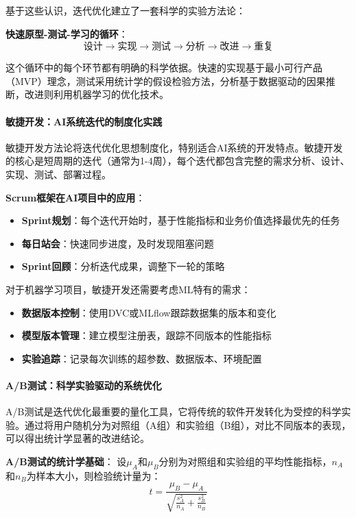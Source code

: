 基于这些认识，迭代优化建立了一套科学的实验方法论：

\textbf{快速原型-测试-学习的循环}：
$$\text{设计} \rightarrow \text{实现} \rightarrow \text{测试} \rightarrow \text{分析} \rightarrow \text{改进} \rightarrow \text{重复}$$

这个循环中的每个环节都有明确的科学依据。快速的实现基于最小可行产品（MVP）理念，测试采用统计学的假设检验方法，分析基于数据驱动的因果推断，改进则利用机器学习的优化技术。

\paragraph{敏捷开发：AI系统迭代的制度化实践}
敏捷开发方法论将迭代优化思想制度化，特别适合AI系统的开发特点。敏捷开发的核心是短周期的迭代（通常为1-4周），每个迭代都包含完整的需求分析、设计、实现、测试、部署过程。

\textbf{Scrum框架在AI项目中的应用}：
\begin{itemize}
\item \textbf{Sprint规划}：每个迭代开始时，基于性能指标和业务价值选择最优先的任务
\item \textbf{每日站会}：快速同步进度，及时发现阻塞问题
\item \textbf{Sprint回顾}：分析迭代成果，调整下一轮的策略
\end{itemize}

对于机器学习项目，敏捷开发还需要考虑ML特有的需求：
\begin{itemize}
\item \textbf{数据版本控制}：使用DVC或MLflow跟踪数据集的版本和变化
\item \textbf{模型版本管理}：建立模型注册表，跟踪不同版本的性能指标
\item \textbf{实验追踪}：记录每次训练的超参数、数据版本、环境配置
\end{itemize}

\paragraph{A/B测试：科学实验驱动的系统优化}
A/B测试是迭代优化最重要的量化工具，它将传统的软件开发转化为受控的科学实验。通过将用户随机分为对照组（A组）和实验组（B组），对比不同版本的表现，可以得出统计学显著的改进结论。

\textbf{A/B测试的统计学基础}：
设$\mu_A$和$\mu_B$分别为对照组和实验组的平均性能指标，$n_A$和$n_B$为样本大小，则检验统计量为：
$$t = \frac{\mu_B - \mu_A}{\sqrt{\frac{s_A^2}{n_A} + \frac{s_B^2}{n_B}}}$$

